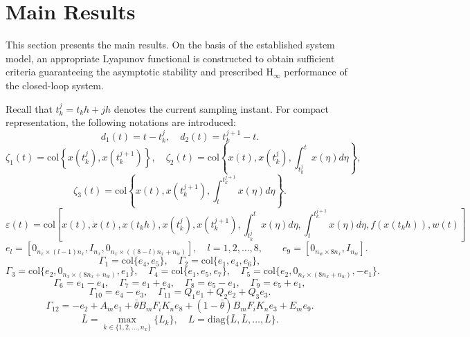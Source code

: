 \documentclass[preprint,review,fleqn,sort&compress,3p]{elsarticle}
\theoremstyle{definition} %
\theoremstyle{definition}%
\begin{document}
\section{Main Results}\label{sec3}
This section presents the main results. On the basis of the established system model, an appropriate Lyapunov functional is constructed to obtain sufficient criteria guaranteeing the asymptotic stability and prescribed $\mathrm{H}_\infty$ performance of the closed-loop system.

Recall that $t_k^j=t_k h+jh$ denotes the current sampling instant. For compact representation, the following notations are introduced:
\begin{equation*}
	d_1(t) = t - t^j_k, \quad  
	d_2(t) = t^{j+1}_{k} - t.
\end{equation*}
\begin{equation*}
	\zeta_1(t) = \mathrm{col} \left\{ x(t^j_k),  x(t^{j+1}_{k}) \right\}, \quad
	\zeta_2(t) = \mathrm{col} \left\{ x(t), x(t_k^j), \int_{t_k^j}^t x(\eta) d\eta \right\},
\end{equation*}
\begin{equation*}
	\zeta_3(t) = \mathrm{col} \left\{ x(t), x(t_k^{j+1}), \int_t^{t_k^{j+1}} x(\eta) d\eta \right\}.
\end{equation*}
\begin{equation*}
	\varepsilon(t) = \mathrm{col}\left[
	x(t),   \dot{x}(t),   x(t_k h),
	x(t_k^j),   x(t^{j+1}_k),
	\int_{t_k^j}^{t} x(\eta) d\eta,
	\int_{t}^{t_k^{j+1}} x(\eta) d\eta,
	f(x(t_k h)),  w(t)
	\right]
\end{equation*}
\begin{equation*}
	e_l = \left[ 0_{n_x \times (l-1)n_x}, I_{n_x}, 0_{n_x \times ((8-l)n_x+n_w)} \right],\quad l = 1,2,\dots,8,\qquad e_9 = \left[ 0_{n_w \times 8n_x}, I_{n_w} \right].
\end{equation*}
\begin{equation*}
	\Gamma_{1}=\mathrm{col}\{e_{4},e_{5}\},\quad
	\Gamma_{2}=\mathrm{col}\{e_{1},e_{4},e_{6}\},
\end{equation*}
\begin{equation*}
	\Gamma_{3}=\mathrm{col}\{e_{2},0_{n_x\times (8n_x+n_w)},e_{1}\},\quad
	\Gamma_{4}=\mathrm{col}\{e_{1},e_{5},e_{7}\},\quad
	\Gamma_{5}=\mathrm{col}\{e_{2},0_{n_x\times (8n_x+n_w)},-e_{1}\}.
\end{equation*}
\begin{equation*}
	\Gamma_{6}=e_{1} - e_{4},\quad
	\Gamma_{7}=e_{1} + e_{4},\quad
	\Gamma_{8}=e_{5} - e_{1},\quad
	\Gamma_{9}=e_{5} + e_{1},
\end{equation*}
\begin{equation*}
	\Gamma_{10}=e_{4} - e_{3},
	\quad
	\Gamma_{11}=Q_1e_{1}+Q_2e_{2}+Q_3e_{3}.
\end{equation*}
\begin{equation*}
	\Gamma_{12}= 
	-e_{2} + A_me_{1} 
	+ \bar{\theta} B_{m} F_{i} K_{n} e_{8}
	+(1-\bar{\theta})B_{m} F_{i} K_{n} e_{3}
	+E_m e_{9}.
\end{equation*}
\begin{equation*}
	\bar{L}= \max_{k \in \{1,2,\ldots,n_x\}} \{L_k\},
	\quad
	L = \mathrm{diag}\{\bar{L}, \bar{L}, \dots, \bar{L}\}.
\end{equation*}
\end{document}
